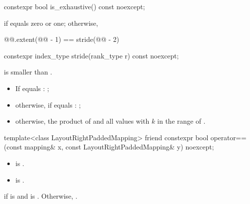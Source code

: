 %
\begin{itemdecl}
constexpr bool is_exhaustive() const noexcept;
\end{itemdecl}

\begin{itemdescr}
\pnum
\returns
{} if  equals zero or one;
otherwise,
\begin{codeblock}
@@.extent(@@ - 1) == stride(@@ - 2)
\end{codeblock}
\end{itemdescr}

%
\begin{itemdecl}
constexpr index_type stride(rank_type r) const noexcept;
\end{itemdecl}

\begin{itemdescr}
\pnum
\expects
{} is smaller than .

\pnum
\returns
\begin{itemize}
\item
If  equals : ;
\item
otherwise, if  equals : ;
\item
otherwise,
the product of  and
all values 
with $k$ in the range of .
\end{itemize}
\end{itemdescr}

%
\begin{itemdecl}
template<class LayoutRightPaddedMapping>
  friend constexpr bool operator==(const mapping& x, const LayoutRightPaddedMapping& y) noexcept;
\end{itemdecl}

\begin{itemdescr}
\pnum
\constraints
\begin{itemize}
\item
{}
is .
\item
{}
is .
\end{itemize}

\pnum
\returns
{} if  is  and
 is .
Otherwise, .
\end{itemdescr}


